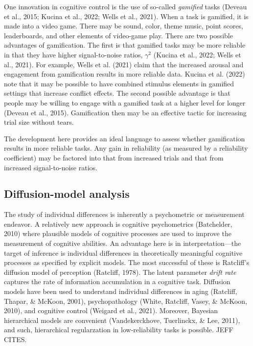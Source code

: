 \documentclass[
  ,man]{apa6}
\begin{document}
One innovation in cognitive control is the use of so-called \emph{gamified} tasks (Deveau et al., 2015; Kucina et al., 2022; Wells et al., 2021). When a task is gamified, it is made into a video game. There may be sound, color, theme music, point scores, leaderboards, and other elements of video-game play. There are two possible advantages of gamification. The first is that gamified tasks may be more reliable in that they have higher signal-to-noise ratios, \(\gamma^2\) (Kucina et al., 2022; Wells et al., 2021). For example, Wells et al. (2021) claim that the increased arousal and engagement from gamification results in more reliable data. Kucina et al. (2022) note that it may be possible to have combined stimulus elements in gamified settings that increase conflict effects. The second possible advantage is that people may be willing to engage with a gamified task at a higher level for longer (Deveau et al., 2015). Gamification then may be an effective tactic for increasing trial size without tears.

The development here provides an ideal language to assess whether gamification results in more reliable tasks. Any gain in reliability (as measured by a reliability coefficient) may be factored into that from increased trials and that from increased signal-to-noise ratios.

\hypertarget{diffusion-model-analysis}{%
\subsection{Diffusion-model analysis}\label{diffusion-model-analysis}}

The study of individual differences is inherently a psychometric or measurement endeavor. A relatively new approach is cognitive psychometrics (Batchelder, 2010) where plausible models of cognitive processes are used to improve the measurement of cognitive abilities. An advantage here is in interpretation---the target of inference is individual differences in theoretically meaningful cognitive processes as specified by explicit models. The most successful of these is Ratcliff's diffusion model of perception (Ratcliff, 1978). The latent parameter \emph{drift rate} captures the rate of information accumulation in a cognitive task. Diffusion models have been used to understand individual differences in aging (Ratcliff, Thapar, \& McKoon, 2001), psychopathology (White, Ratcliff, Vasey, \& McKoon, 2010), and cognitive control (Weigard et al., 2021). Moreover, Bayesian hierarchical models are convenient (Vandekerckhove, Tuerlinckx, \& Lee, 2011), and such, hierarchical regularzation in low-reliability tasks is possible. JEFF CITES.
\end{document}

